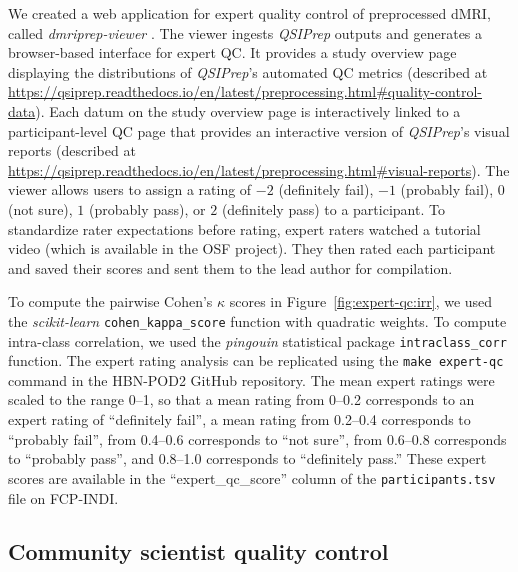 \documentclass[9pt,lineno]{elife}
\begin{document}
We created a web application for expert quality control of preprocessed dMRI,
called \emph{dmriprep-viewer} \citep{richie-halford2021-viewer}. The viewer
ingests \emph{QSIPrep} outputs and generates a browser-based interface for
expert QC. It provides a study overview page displaying the distributions of
\emph{QSIPrep}'s automated QC metrics (described at
\url{https://qsiprep.readthedocs.io/en/latest/preprocessing.html#quality-control-data}).
Each datum on the study overview page is interactively linked to a participant-level
QC page that provides an interactive version of \emph{QSIPrep}'s visual reports
(described at
\url{https://qsiprep.readthedocs.io/en/latest/preprocessing.html#visual-reports}).
The viewer allows users to assign a rating of $-2$ (definitely fail), $-1$
(probably fail), $0$ (not sure), $1$ (probably pass), or $2$ (definitely pass) to a
participant. To standardize rater expectations before rating, expert raters watched
a tutorial video (which is available in the OSF project). They then rated each
participant and saved their scores and sent them to the lead author for compilation.


To compute the pairwise Cohen's $\kappa$ scores in Figure~\ref{fig:expert-qc:irr}, we
used the \emph{scikit-learn} \citep{scikit-learn} \texttt{cohen\_kappa\_score}
function with quadratic weights. To compute intra-class correlation, we used the
\emph{pingouin} statistical package \citep{vallat2018pingouin}
\texttt{intraclass\_corr} function. The expert rating analysis can be replicated
using the \texttt{make expert-qc} command in the HBN-POD2 GitHub repository.
The mean expert ratings were scaled to the range \numrange{0}{1}, so that a mean rating from \numrange{0}{0.2} corresponds to an expert rating of ``definitely fail'', a mean rating from \numrange{0.2}{0.4} corresponds to ``probably fail'', from \numrange{0.4}{0.6} corresponds to ``not sure'', from \numrange{0.6}{0.8} corresponds to ``probably pass'', and \numrange{0.8}{1.0} corresponds to ``definitely pass.'' These expert scores are available in the
``expert\_qc\_score'' column of the \texttt{participants.tsv} file on FCP-INDI.

\subsection{Community scientist quality control}
\end{document}
